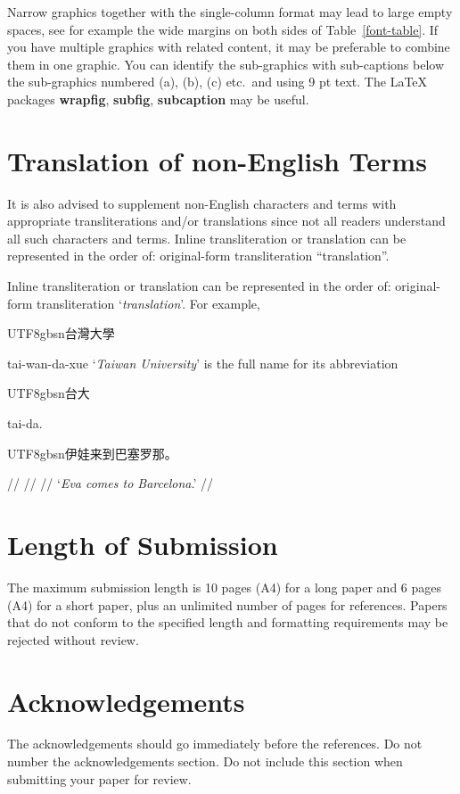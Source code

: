 \documentclass[11pt]{article}
\newcommand{\Chinese}[1]{\begin{CJK*}{UTF8}{gbsn}#1\end{CJK*}}
\begin{document}
Narrow graphics together with the single-column format may lead to large empty spaces, see for example the wide margins on both sides of Table~\ref{font-table}. If you have multiple graphics with related content, it may be preferable to combine them in one graphic. You can identify the sub-graphics with sub-captions below the sub-graphics numbered (a), (b), (c) etc.\ and using 9 pt text. The LaTeX packages \textbf{wrapfig}, \textbf{subfig}, \textbf{subcaption} may be useful.



\section{Translation of non-English Terms}

It is also advised to supplement non-English characters and terms with appropriate transliterations and/or translations
since not all readers understand all such characters and terms.
Inline transliteration or translation can be represented in
the order of: original-form transliteration ``translation''.

Inline transliteration or translation can be represented in the order of: original-form transliteration `\emph{translation}'. For example, \Chinese{台灣大學} tai-wan-da-xue `\emph{Taiwan University}' is the full name for its abbreviation \Chinese{台大} tai-da.

\ex
\begingl
\gla \Chinese{伊娃来到巴塞罗那。}//
 //
 //
\glft `\emph{Eva comes to Barcelona}.' //
\endgl
\xe


\section{Length of Submission}
\label{sec:length}

The maximum submission length is 10 pages (A4) for a long paper and 6 pages (A4) for a short paper, plus an unlimited number of pages for references. Papers that do not conform to the specified length and formatting requirements may be rejected without review.

\section*{Acknowledgements}

The acknowledgements should go immediately before the references. Do not number the acknowledgements section. Do not include this section when submitting your paper for review.
\end{document}
